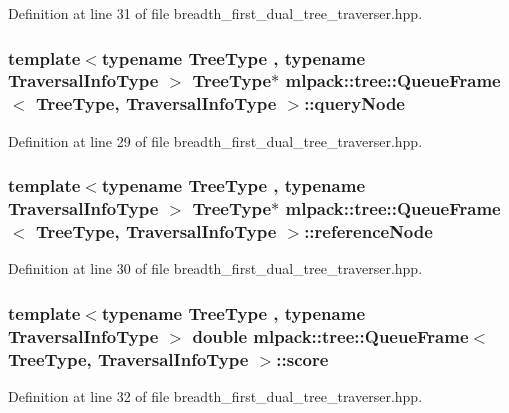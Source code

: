 Definition at line 31 of file breadth\+\_\+first\+\_\+dual\+\_\+tree\+\_\+traverser.\+hpp.

\subsubsection[{query\+Node}]{\setlength{\rightskip}{0pt plus 5cm}template$<$typename Tree\+Type , typename Traversal\+Info\+Type $>$ Tree\+Type$\ast$ {\bf mlpack\+::tree\+::\+Queue\+Frame}$<$ Tree\+Type, Traversal\+Info\+Type $>$\+::query\+Node}\label{structmlpack_1_1tree_1_1QueueFrame_a80e569d9e3e85071cdf487845929a0e2}


Definition at line 29 of file breadth\+\_\+first\+\_\+dual\+\_\+tree\+\_\+traverser.\+hpp.

\subsubsection[{reference\+Node}]{\setlength{\rightskip}{0pt plus 5cm}template$<$typename Tree\+Type , typename Traversal\+Info\+Type $>$ Tree\+Type$\ast$ {\bf mlpack\+::tree\+::\+Queue\+Frame}$<$ Tree\+Type, Traversal\+Info\+Type $>$\+::reference\+Node}\label{structmlpack_1_1tree_1_1QueueFrame_a8cee48e6adf4fa74962e1f9695cb457e}


Definition at line 30 of file breadth\+\_\+first\+\_\+dual\+\_\+tree\+\_\+traverser.\+hpp.

\subsubsection[{score}]{\setlength{\rightskip}{0pt plus 5cm}template$<$typename Tree\+Type , typename Traversal\+Info\+Type $>$ double {\bf mlpack\+::tree\+::\+Queue\+Frame}$<$ Tree\+Type, Traversal\+Info\+Type $>$\+::score}\label{structmlpack_1_1tree_1_1QueueFrame_a3d147bd089c175b909784626a67611f4}


Definition at line 32 of file breadth\+\_\+first\+\_\+dual\+\_\+tree\+\_\+traverser.\+hpp.

